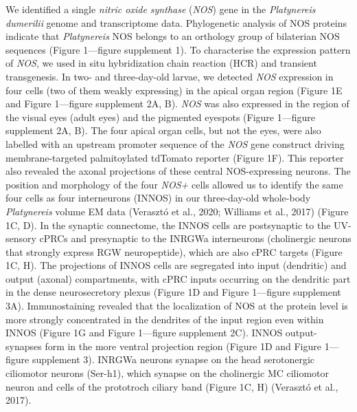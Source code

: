 \documentclass[
  10pt,
  onecolumn]{article}
\begin{document}
We identified a single \emph{nitric oxide synthase} (\emph{NOS}) gene in
the \emph{Platynereis dumerilii} genome and transcriptome data.
Phylogenetic analysis of NOS proteins indicate that \emph{Platynereis}
NOS belongs to an orthology group of bilaterian NOS sequences (Figure
1---figure supplement 1). To characterise the expression pattern of
\emph{NOS}, we used in situ hybridization chain reaction (HCR) and
transient transgenesis. In two- and three-day-old larvae, we detected
\emph{NOS} expression in four cells (two of them weakly expressing) in
the apical organ region (Figure 1E and Figure 1---figure supplement 2A,
B). \emph{NOS} was also expressed in the region of the visual eyes
(adult eyes) and the pigmented eyespots (Figure 1---figure supplement
2A, B). The four apical organ cells, but not the eyes, were also
labelled with an upstream promoter sequence of the \emph{NOS} gene
construct driving membrane-targeted palmitoylated tdTomato reporter
(Figure 1F). This reporter also revealed the axonal projections of these
central NOS-expressing neurons. The position and morphology of the four
\emph{NOS+} cells allowed us to identify the same four cells as four
interneurons (INNOS) in our three-day-old whole-body \emph{Platynereis}
volume EM data (Verasztó et al., 2020; Williams et al., 2017) (Figure
1C, D). In the synaptic connectome, the INNOS cells are postsynaptic to
the UV-sensory cPRCs and presynaptic to the INRGWa interneurons
(cholinergic neurons that strongly express RGW neuropeptide), which are
also cPRC targets (Figure 1C, H). The projections of INNOS cells are
segregated into input (dendritic) and output (axonal) compartments, with
cPRC inputs occurring on the dendritic part in the dense neurosecretory
plexus (Figure 1D and Figure 1---figure supplement 3A). Immunostaining
revealed that the localization of NOS at the protein level is more
strongly concentrated in the dendrites of the input region even within
INNOS (Figure 1G and Figure 1---figure supplement 2C). INNOS
output-synapses form in the more ventral projection region (Figure 1D
and Figure 1---figure supplement 3). INRGWa neurons synapse on the head
serotonergic ciliomotor neurons (Ser-h1), which synapse on the
cholinergic MC ciliomotor neuron and cells of the prototroch ciliary
band (Figure 1C, H) (Verasztó et al., 2017).
\end{document}
